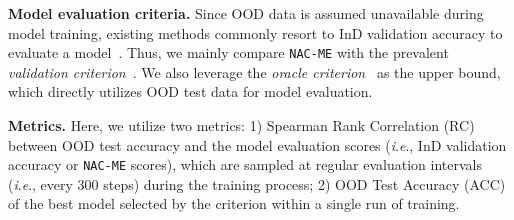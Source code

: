 \documentclass{article} \usepackage{iclr2024_conference,times}
\newcommand{\ie}{\textit{i}.\textit{e}.}
\newcommand{\bfstart}[1]{\noindent\textbf{#1.}}
\begin{document}
\bfstart{Model evaluation criteria} 
Since OOD data is assumed unavailable during model training, existing methods commonly resort to InD validation accuracy to evaluate a model~\citep{Baseline:Fishr,CL&DG:PCL,Baseline:Fish,CL&DG:SelfReg}. 
Thus, we mainly compare \texttt{NAC-ME} with the prevalent \textit{validation criterion}~\citep{Setup:DomainBed}. 
We also leverage the \textit{oracle criterion}~\citep{Setup:DomainBed} as the upper bound, which directly utilizes OOD test data for model evaluation. 








\bfstart{Metrics} 
Here, we utilize two metrics: 1) Spearman Rank Correlation (RC) between OOD test accuracy and the model evaluation scores (\ie, InD validation accuracy or \texttt{NAC-ME} scores), which are sampled at regular evaluation intervals (\ie, every 300 steps) during the training process; 
2) OOD Test Accuracy (ACC) of the best model selected by the criterion within a single run of training. 
\end{document}
